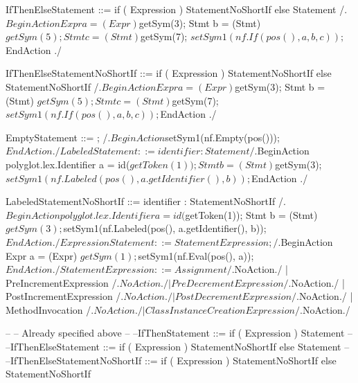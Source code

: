     IfThenElseStatement ::= if ( Expression ) StatementNoShortIf else Statement
        /.$BeginAction
                    Expr a = (Expr) $getSym(3);
                    Stmt b = (Stmt) $getSym(5);
                    Stmt c = (Stmt) $getSym(7);
                    $setSym1(nf.If(pos(), a, b, c));
          $EndAction
        ./
    
    IfThenElseStatementNoShortIf ::= if ( Expression ) StatementNoShortIf else StatementNoShortIf
        /.$BeginAction
                    Expr a = (Expr) $getSym(3);
                    Stmt b = (Stmt) $getSym(5);
                    Stmt c = (Stmt) $getSym(7);
                    $setSym1(nf.If(pos(), a, b, c));
          $EndAction
        ./
    
    EmptyStatement ::= ;
        /.$BeginAction
                    $setSym1(nf.Empty(pos()));
          $EndAction
        ./
    
    LabeledStatement ::= identifier : Statement
        /.$BeginAction
                    polyglot.lex.Identifier a = id($getToken(1));
                    Stmt b = (Stmt) $getSym(3);
                    $setSym1(nf.Labeled(pos(), a.getIdentifier(), b));
          $EndAction
        ./
    
    LabeledStatementNoShortIf ::= identifier : StatementNoShortIf
        /.$BeginAction
                    polyglot.lex.Identifier a = id($getToken(1));
                    Stmt b = (Stmt) $getSym(3);
                    $setSym1(nf.Labeled(pos(), a.getIdentifier(), b));
          $EndAction
        ./
    
    ExpressionStatement ::= StatementExpression ;
        /.$BeginAction
                    Expr a = (Expr) $getSym(1);
                    $setSym1(nf.Eval(pos(), a));
          $EndAction
        ./
    
    StatementExpression ::= Assignment
        /.$NoAction./
                          | PreIncrementExpression
        /.$NoAction./
                          | PreDecrementExpression
        /.$NoAction./
                          | PostIncrementExpression
        /.$NoAction./
                          | PostDecrementExpression
        /.$NoAction./
                          | MethodInvocation
        /.$NoAction./
                          | ClassInstanceCreationExpression
        /.$NoAction./
    
    --
    -- Already specified above
    --
    --IfThenStatement ::= if ( Expression ) Statement
    --
    --IfThenElseStatement ::= if ( Expression ) StatementNoShortIf else Statement
    --
    --IfThenElseStatementNoShortIf ::= if ( Expression ) StatementNoShortIf else StatementNoShortIf
    
